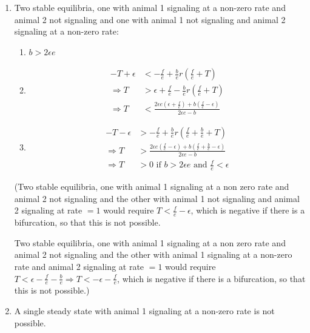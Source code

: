 \documentclass{article}
\begin{document}
\begin{enumerate}
\item Two stable equilibria, one with animal 1 signaling at a non-zero rate and animal 2 not signaling and one with animal 1 not signaling and animal 2 signaling at a non-zero rate:
\begin{enumerate}
\item $b>2\epsilon e$
\item 
\begin{align*}
-T+\epsilon&<-\frac{f}{e}+\frac{b}{e}r\left(\frac{f}{e}+T\right)
\\ \Rightarrow T&>\epsilon+\frac{f}{e}-\frac{b}{e}r\left(\frac{f}{e}+T\right)
\\ \Rightarrow T&<\frac{ 2\epsilon e(\epsilon+\frac{f}{e})+b(\frac{f}{e}-\epsilon)}{2\epsilon e-b}\end{align*}
\item 
\begin{align*}
-T-\epsilon&>-\frac{f}{e}+\frac{b}{e}r\left(\frac{f}{e}+\frac{b}{e}+T\right)
\\ \Rightarrow T&>\frac{2\epsilon e(\frac{f}{e}-\epsilon)+b(\frac{f}{e}+\frac{b}{e}-\epsilon)}{2\epsilon e-b}
\\ \Rightarrow T&>0 \text{ if } b>2\epsilon e \text{ and } \frac{f}{e}<\epsilon 
\end{align*}
\end{enumerate}
(Two stable equilibria, one with animal 1 signaling at a non zero rate and animal 2 not signaling and the other with animal 1 not signaling and animal 2 signaling at rate $=1$ would require $T<\frac{f}{e}-\epsilon$, which is negative if there is a bifurcation, so that this is not possible.  

Two stable equilibria, one with animal 1 signaling at a non zero rate and animal 2 not signaling and the other with animal 1 signaling at a non-zero rate and animal 2 signaling at rate $=1$ would require $T<\epsilon-\frac{f}{e}-\frac{b}{e}\Rightarrow T<-\epsilon-\frac{f}{e}$, which is negative if there is a bifurcation, so that this is not possible.)
\item A single steady state with animal 1 signaling at a non-zero rate is not possible.
\end{enumerate}
\end{document}
